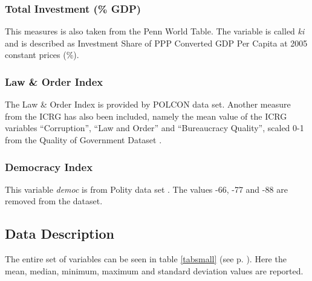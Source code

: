 \documentclass{article}\usepackage{graphicx, color}
\begin{document}
\subsubsection{Total Investment (\% GDP)}

This measures is also taken from the Penn World Table. The variable
is called \emph{ki} and is described as Investment Share of PPP Converted
GDP Per Capita at 2005 constant prices (\%).


\subsubsection{Law \& Order Index}

The Law \& Order Index is provided by POLCON data set. Another measure
from the ICRG has also been included, namely the mean value of the
ICRG variables \textquotedblleft{}Corruption\textquotedblright{},
\textquotedblleft{}Law and Order\textquotedblright{} and \textquotedblleft{}Bureaucracy
Quality\textquotedblright{}, scaled 0-1 from the Quality of Government
Dataset \citep{teorell2011thequality}.







\subsubsection{Democracy Index}

This variable \emph{democ }is from Polity data set \citep{marshall2011polityiv}.
The values -66, -77 and -88 are removed from the dataset.








\subsection{Data Description}

The entire set of variables can be seen in table \ref{tabsmall} (see
p. \pageref{tabsmall}). Here the mean, median, minimum, maximum and
standard deviation values are reported.

\begin{singlespace}
\begin{flushleft}


\par\end{flushleft}
\end{singlespace}
\end{document}
